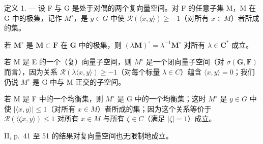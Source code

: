 定义 1. --- 设 F 与 G 是处于对偶的两个复向量空间。对 F 的任意子集 M，M 在 G 中的极集，记作 \(M^{\circ}\)，是 \(y \in G\) 中使 \(\mathcal{R}(\langle x, y \rangle) \geqslant -1\)（对所有 \(x \in M\)）者所成的集。

若 \(\mathbf{M}^{\circ}\) 是 \(\mathbf{M} \subset \mathbf{F}\) 在 \(\mathbf{G}\) 中的极集，则 \((\lambda \mathbf{M})^{\circ} = \lambda^{-1}\mathbf{M}^{\circ}\) 对所有 \(\lambda \in \mathbf{C}^{*}\) 成立。

若 M 是 E 的一个（复）向量子空间，则 \(M^{\circ}\) 是一个闭向量子空间（对 \(\sigma(\mathbf{G},\mathbf{F})\) 而言），因为关系 \(\mathcal{R}(\lambda\langle x,y\rangle)\geqslant-1\)（对每个标量 \(\lambda\in C\)）蕴含 \(\langle x,y\rangle=0\)；我们仍说 \(M^{\circ}\) 是 G 中与 M 正交的子空间。

若 M 是 F 中的一个均衡集，则 \(M^{\circ}\) 是 G 中的一个均衡集；这时 \(M^{\circ}\) 是 \(y \in G\) 中使 \(\left|\langle x, y \rangle\right| \leqslant 1\)（对所有 \(x \in M\)）者所成的集；因为这个关系等价于 \(\mathcal{R}(\langle \zeta x, y \rangle) \leqslant 1\) 对所有 \(x \in M\) 与所有 \(\zeta \in C\)（满足 \(|\zeta| = 1\)）成立。

II, p.~41 至 51 的结果对复向量空间也无限制地成立。

\exercisesheading
